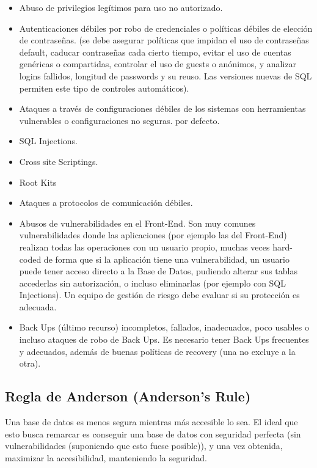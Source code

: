 \begin{itemize}
    \item Abuso de privilegios legítimos para uso no autorizado.
    \item Autenticaciones débiles por robo de credenciales o políticas débiles de elección de contraseñas. (se debe asegurar políticas que impidan el uso de contraseñas default, caducar contraseñas cada cierto tiempo, evitar el uso de cuentas genéricas o compartidas, controlar el uso de guests o anónimos, y analizar logins fallidos, longitud de passwords y su reuso. Las versiones nuevas de SQL permiten este tipo de controles automáticos).
    \item Ataques a través de configuraciones débiles de los sistemas con herramientas vulnerables o configuraciones no seguras.
por defecto.
    \item SQL Injections.
    \item Cross site Scriptings.
    \item Root Kits
    \item Ataques a protocolos de comunicación débiles.
    \item Abusos de vulnerabilidades en el Front-End. Son muy comunes vulnerabilidades donde las aplicaciones (por ejemplo las del Front-End) realizan todas las operaciones con un usuario propio, muchas veces hard-coded de forma que si la aplicación tiene una vulnerabilidad, un usuario puede tener acceso directo a la Base de Datos, pudiendo alterar sus tablas accederlas sin autorización, o incluso eliminarlas (por ejemplo con SQL Injections). Un  equipo de gestión de riesgo debe evaluar si su protección es adecuada.
    \item Back Ups (último recurso) incompletos, fallados, inadecuados, poco usables o incluso ataques de robo de Back Ups. Es necesario tener Back Ups frecuentes y adecuados, además de buenas políticas de recovery (una no excluye a la otra).
\end{itemize}

\subsection*{Regla de Anderson (Anderson's Rule)}

Una base de datos es menos segura mientras más accesible lo sea. El ideal que esto busca remarcar es conseguir una base de datos con seguridad perfecta (sin vulnerabilidades (suponiendo que esto fuese posible)), y una vez obtenida, maximizar la accesibilidad, manteniendo la seguridad.

